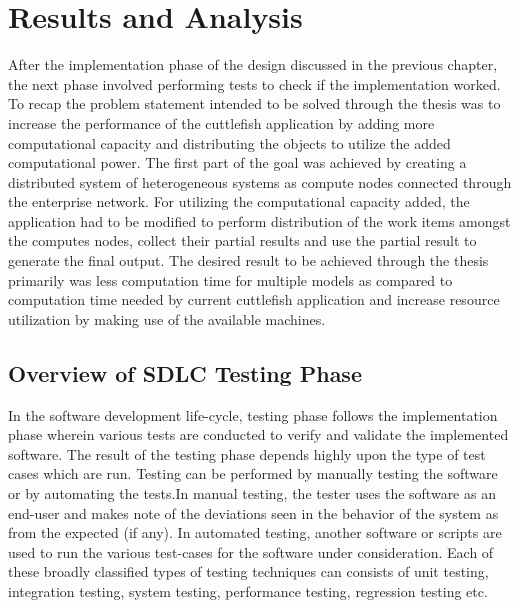 \chapter{Results and Analysis}

After the implementation phase of the design discussed in the previous chapter, the next phase involved performing tests to check if the implementation worked. To recap the problem statement intended to be solved through the thesis was to increase the performance of the cuttlefish application by adding more computational capacity and distributing the objects to utilize the added computational power. The first part of the goal was achieved by creating a distributed system of heterogeneous systems as compute nodes connected through the enterprise network. For utilizing the computational capacity added, the application had to be modified to perform distribution of the work items amongst the computes nodes, collect their partial results and use the partial result to generate the final output. The desired result to be achieved through the thesis primarily was less computation time for multiple models as compared to computation time needed by current cuttlefish application and increase resource utilization by making use of the available machines.\newline

\section{Overview of SDLC Testing Phase}

In the software development life-cycle, testing phase follows the implementation phase wherein various tests are conducted to verify and validate the implemented software. The result of the testing phase depends highly upon the type of test cases which are run. Testing can be performed by manually testing the software or by automating the tests.In manual testing, the tester uses the software as an end-user and makes note of the deviations seen in the behavior of the system as from the expected (if any). In automated testing, another software or scripts are used to run the various test-cases for the software under consideration. Each of these broadly classified types of testing techniques can consists of unit testing, integration testing, system testing, performance testing, regression testing etc.\newline

